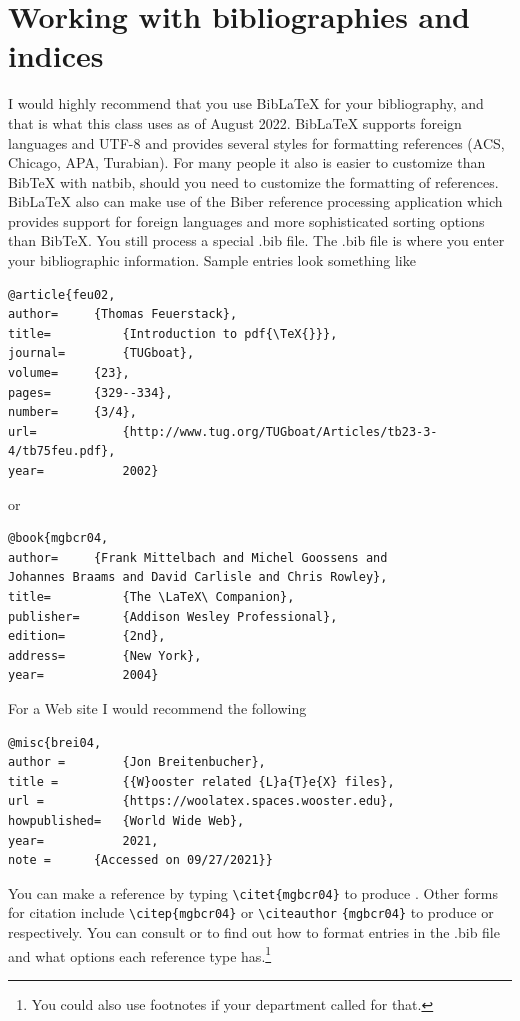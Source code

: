 \chapter{Working with bibliographies and indices}\label{bibind}
I would highly recommend that you use Bib\LaTeX{} for your bibliography, and that is what this class uses as of August 2022. Bib\LaTeX{} supports foreign languages and UTF-8 and provides several styles for formatting references (ACS, Chicago, APA, Turabian). For many people it also is easier to customize than Bib\TeX{} with natbib, should you need to customize the formatting of references. Bib\LaTeX{} also can make use of the Biber reference processing application which provides support for foreign languages and more sophisticated sorting options than Bib\TeX{}. You still process a special .bib file. The .bib file is where you enter your bibliographic information. Sample entries look something like
\begin{singlespace}\small
\begin{verbatim}
@article{feu02,
author=		{Thomas Feuerstack},
title=			{Introduction to pdf{\TeX{}}}, 
journal=		{TUGboat}, 
volume=		{23},
pages=		{329--334},
number=		{3/4},
url=			{http://www.tug.org/TUGboat/Articles/tb23-3-4/tb75feu.pdf},
year=			2002}
\end{verbatim}
\end{singlespace}
or
\begin{singlespace}\small
\begin{verbatim}
@book{mgbcr04,
author=		{Frank Mittelbach and Michel Goossens and
Johannes Braams and David Carlisle and Chris Rowley},
title=			{The \LaTeX\ Companion},
publisher=		{Addison Wesley Professional},
edition=		{2nd},
address=		{New York},
year=			2004}
\end{verbatim}
\end{singlespace}

For a Web site I would recommend the following
\begin{singlespace}\small
\begin{verbatim}
@misc{brei04,
author = 		{Jon Breitenbucher},
title = 		{{W}ooster related {L}a{T}e{X} files},
url = 			{https://woolatex.spaces.wooster.edu},
howpublished=	{World Wide Web},
year=			2021,
note = 		{Accessed on 09/27/2021}}
\end{verbatim}
\end{singlespace}

You can make a reference by typing \verb|\citet{mgbcr04}| to produce \citet{mgbcr04}. Other forms for citation include \verb|\citep{mgbcr04}| or  \verb|\citeauthor| \verb|{mgbcr04}| to produce \citep{mgbcr04} or \citeauthor{mgbcr04} respectively. You can consult \citet{kd03} or \citet{mgbcr04} to find out how to format entries in the .bib file and what options each reference type has.\footnote{You could also use footnotes if your department called for that.}

